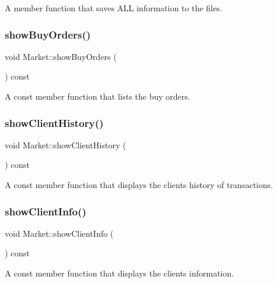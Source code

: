 A member function that saves A\+LL information to the files. \hypertarget{class_market_aa6a0bba5a4f5fdd7fa4ffecb50c90c3b}{}\label{class_market_aa6a0bba5a4f5fdd7fa4ffecb50c90c3b} 
\subsubsection{\texorpdfstring{show\+Buy\+Orders()}{showBuyOrders()}}
{\footnotesize\ttfamily void Market\+::show\+Buy\+Orders (\begin{DoxyParamCaption}{ }\end{DoxyParamCaption}) const}

A const member function that lists the buy orders. \hypertarget{class_market_ab12d4a35aed820924483f336948cf4b4}{}\label{class_market_ab12d4a35aed820924483f336948cf4b4} 
\subsubsection{\texorpdfstring{show\+Client\+History()}{showClientHistory()}}
{\footnotesize\ttfamily void Market\+::show\+Client\+History (\begin{DoxyParamCaption}{ }\end{DoxyParamCaption}) const}

A const member function that displays the client\textquotesingle{}s history of transactions. \hypertarget{class_market_ad55d5db41984c8c4f1f027cd1f720a0b}{}\label{class_market_ad55d5db41984c8c4f1f027cd1f720a0b} 
\subsubsection{\texorpdfstring{show\+Client\+Info()}{showClientInfo()}}
{\footnotesize\ttfamily void Market\+::show\+Client\+Info (\begin{DoxyParamCaption}{ }\end{DoxyParamCaption}) const}

A const member function that displays the client\textquotesingle{}s information. \hypertarget{class_market_aa81ff10670a6d41b22573cb48c40938e}{}\label{class_market_aa81ff10670a6d41b22573cb48c40938e} 
